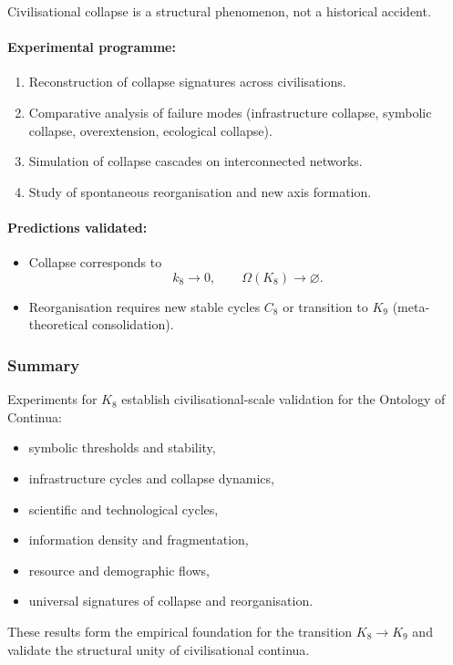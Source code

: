 Civilisational collapse is a structural phenomenon, not a historical accident.

\paragraph{Experimental programme:}

\begin{enumerate}
    \item Reconstruction of collapse signatures across civilisations.
    \item Comparative analysis of failure modes 
          (infrastructure collapse, symbolic collapse,
           overextension, ecological collapse).
    \item Simulation of collapse cascades on interconnected networks.
    \item Study of spontaneous reorganisation and new axis formation.
\end{enumerate}

\paragraph{Predictions validated:}

\begin{itemize}
    \item Collapse corresponds to 
          \[
             k_8 \rightarrow 0,\qquad \Omega(K_8) \rightarrow \varnothing.
          \]
    \item Reorganisation requires new stable cycles $C_8$ 
          or transition to $K_9$ (meta-theoretical consolidation).
\end{itemize}



\subsubsection{Summary}

Experiments for $K_8$ establish civilisational-scale validation for the Ontology of Continua:

\begin{itemize}
    \item symbolic thresholds and stability,
    \item infrastructure cycles and collapse dynamics,
    \item scientific and technological cycles,
    \item information density and fragmentation,
    \item resource and demographic flows,
    \item universal signatures of collapse and reorganisation.
\end{itemize}

These results form the empirical foundation for the transition $K_8 \rightarrow K_9$
and validate the structural unity of civilisational continua.

